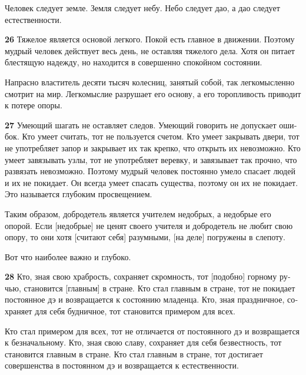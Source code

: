 \documentclass[a4paper]{article}
\begin{document}
{
Человек следует земле. Земля следует небу. Небо следует дао, а дао следует естественности.}

{\ttfamily
\foreignlanguage{russian}{\textrm{\textbf{26}}}\foreignlanguage{russian}{\textrm{ Тяжелое является основой легкого.
Покой есть главное в движении. Поэтому мудрый человек действует весь день, не оставляя тяжелого дела. Хотя он питает
блестящую надежду, но находится в совершенно спокойном состоянии.}}}

{
Напрасно властитель десяти тысяч колесниц, занятый собой, так легкомысленно смотрит на мир. Легкомыслие разрушает его
основу, а его торопливость приводит к потере опоры.}


\bigskip

{\ttfamily
\foreignlanguage{russian}{\textrm{\textbf{27}}}\foreignlanguage{russian}{\textrm{ Умеющий шагать не оставляет следов.
Умеющий говорить не допускает ошибок. Кто умеет считать, тот не пользуется счетом. Кто умеет закрывать двери, тот не
употребляет запор и закрывает их так крепко, что открыть их невозможно. Кто умеет завязывать узлы, тот не употребляет
веревку, и завязывает так прочно, что развязать невозможно. Поэтому мудрый человек постоянно умело спасает людей и их
не покидает. Он всегда умеет спасать существа, поэтому он их не покидает. Это называется глубоким просвещением.}}}

{
Таким образом, добродетель является учителем недобрых, а недобрые его опорой. Если [недобрые] не ценят своего учителя и
добродетель не любит свою опору, то они хотя [считают себя] разумными, [на деле] погружены в слепоту.}

{
Вот что наиболее важно и глубоко.}

{\ttfamily
\foreignlanguage{russian}{\textrm{\textbf{28}}}\foreignlanguage{russian}{\textrm{ Кто, зная свою храбрость, сохраняет
скромность, тот [подобно] горному ручью, становится [главным] в стране. Кто стал главным в стране, тот не покидает
постоянное дэ и возвращается к состоянию младенца. Кто, зная праздничное, сохраняет для себя будничное, тот становится
примером для всех.}}}

{
Кто стал примером для всех, тот не отличается от постоянного дэ и возвращается к безначальному. Кто, зная свою славу,
сохраняет для себя безвестность, тот становится главным в стране. Кто стал главным в стране, тот достигает совершенства
в постоянном дэ и возвращается к естественности.}
\end{document}
